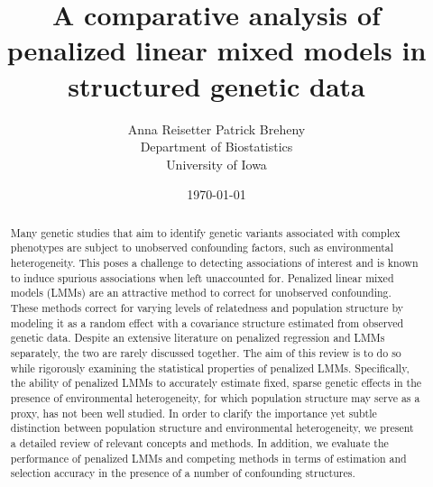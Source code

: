 \documentclass[a4paper]{article}
\title{A comparative analysis of penalized linear mixed models in structured genetic data}
\author{Anna Reisetter \qquad Patrick Breheny\\
  Department of Biostatistics\\University of Iowa}
\date{\today}
\begin{document}
\maketitle

\begin{abstract}
Many genetic studies that aim to identify genetic variants associated with complex phenotypes are subject to unobserved confounding factors, such as environmental heterogeneity. This poses a challenge to detecting associations of interest and is known to induce spurious associations when left unaccounted for. Penalized linear mixed models (LMMs) are an attractive method to correct for unobserved confounding. These methods correct for varying levels of relatedness and population structure by modeling it as a random effect with a covariance structure estimated from observed genetic data. Despite an extensive literature on penalized regression and LMMs separately, the two are rarely discussed together. The aim of this review is to do so while rigorously examining the statistical properties of penalized LMMs. Specifically, the ability of penalized LMMs to accurately estimate fixed, sparse genetic effects in the presence of environmental heterogeneity, for which population structure may serve as a proxy, has not been well studied. In order to clarify the importance yet subtle distinction between population structure and environmental heterogeneity, we present a detailed review of relevant concepts and methods. In addition, we evaluate the performance of penalized LMMs and competing methods in terms of estimation and selection accuracy in the presence of a number of confounding structures.
\end{abstract}



\newpage



\newpage

\end{document}
